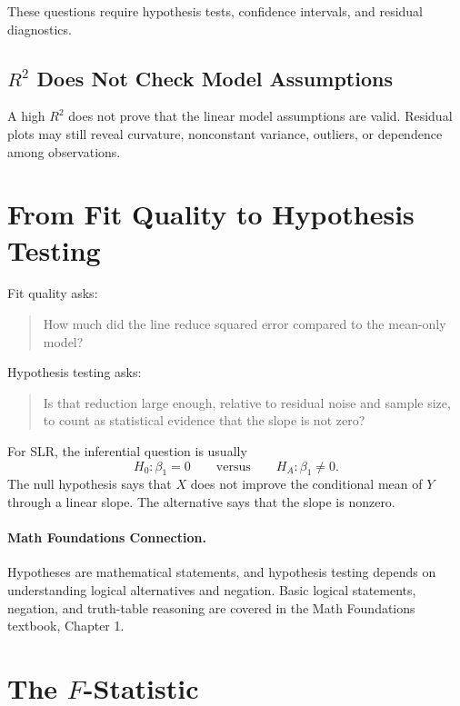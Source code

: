These questions require hypothesis tests, confidence intervals, and residual diagnostics.

\subsection{\texorpdfstring{$R^2$}{R-squared} Does Not Check Model Assumptions}

A high $R^2$ does not prove that the linear model assumptions are valid.  Residual plots may still reveal curvature, nonconstant variance, outliers, or dependence among observations.

\section{From Fit Quality to Hypothesis Testing}

Fit quality asks:
\begin{quote}
  How much did the line reduce squared error compared to the mean-only model?
\end{quote}

Hypothesis testing asks:
\begin{quote}
  Is that reduction large enough, relative to residual noise and sample size, to count as statistical evidence that the slope is not zero?
\end{quote}

For SLR, the inferential question is usually
\begin{equation}
  H_0:\beta_1=0
  \qquad\text{versus}\qquad
  H_A:\beta_1\neq 0.
  \label{eq:ch6-slope-hypotheses}
\end{equation}
The null hypothesis says that $X$ does not improve the conditional mean of $Y$ through a linear slope.  The alternative says that the slope is nonzero.

\paragraph{Math Foundations Connection.}
Hypotheses are mathematical statements, and hypothesis testing depends on understanding logical alternatives and negation.  Basic logical statements, negation, and truth-table reasoning are covered in the Math Foundations textbook, Chapter 1.

\section{The \texorpdfstring{$F$}{F}-Statistic}

